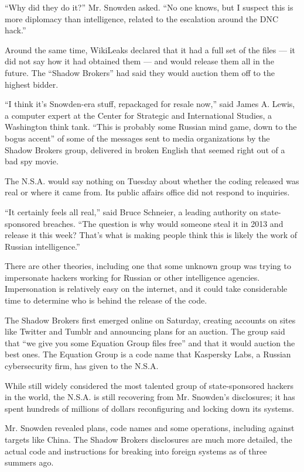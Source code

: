 ``Why did they do it?'' Mr. Snowden asked. ``No one knows, but I suspect
this is more diplomacy than intelligence, related to the escalation
around the DNC hack.''

Around the same time, WikiLeaks declared that it had a full set of the
files --- it did not say how it had obtained them --- and would release
them all in the future. The ``Shadow Brokers'' had said they would
auction them off to the highest bidder.

``I think it's Snowden-era stuff, repackaged for resale now,'' said
James A. Lewis, a computer expert at the Center for Strategic and
International Studies, a Washington think tank. ``This is probably some
Russian mind game, down to the bogus accent'' of some of the messages
sent to media organizations by the Shadow Brokers group, delivered in
broken English that seemed right out of a bad spy movie.

The N.S.A. would say nothing on Tuesday about whether the coding
released was real or where it came from. Its public affairs office did
not respond to inquiries.

``It certainly feels all real,'' said Bruce Schneier, a leading
authority on state-sponsored breaches. ``The question is why would
someone steal it in 2013 and release it this week? That's what is making
people think this is likely the work of Russian intelligence.''

There are other theories, including one that some unknown group was
trying to impersonate hackers working for Russian or other intelligence
agencies. Impersonation is relatively easy on the internet, and it could
take considerable time to determine who is behind the release of the
code.

The Shadow Brokers first emerged online on Saturday, creating accounts
on sites like Twitter and Tumblr and announcing plans for an auction.
The group said that ``we give you some Equation Group files free'' and
that it would auction the best ones. The Equation Group is a code name
that Kaspersky Labs, a Russian cybersecurity firm, has given to the
N.S.A.

While still widely considered the most talented group of state-sponsored
hackers in the world, the N.S.A. is still recovering from Mr. Snowden's
disclosures; it has spent hundreds of millions of dollars reconfiguring
and locking down its systems.

Mr. Snowden revealed plans, code names and some operations, including
against targets like China. The Shadow Brokers disclosures are much more
detailed, the actual code and instructions for breaking into foreign
systems as of three summers ago.

